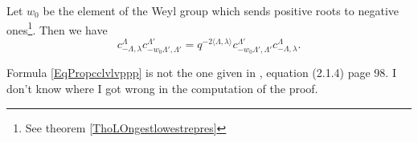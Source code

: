 \begin{proposition}
    Let \( w_0\) be the element of the Weyl group which sends positive roots to negative ones\footnote{See theorem \ref{ThoLOngestlowestrepres}}. Then we have
    \begin{equation}        \label{EqPropcclvlvppp}
        c^{\Lambda}_{-\Lambda,\lambda}c^{\Lambda'}_{-w_0\Lambda',\Lambda'}=q^{-2\langle \Lambda, \lambda\rangle }c^{\Lambda'}_{-w_0\Lambda',\Lambda'}c^{\Lambda}_{-\Lambda,\lambda}.
    \end{equation}
\end{proposition}

\begin{probleme}
    Formula \eqref{EqPropcclvlvppp} is not the one given in \cite{SoibelmanI}, equation (2.1.4) page 98. I don't know where I got wrong in the computation of the proof.
\end{probleme}

